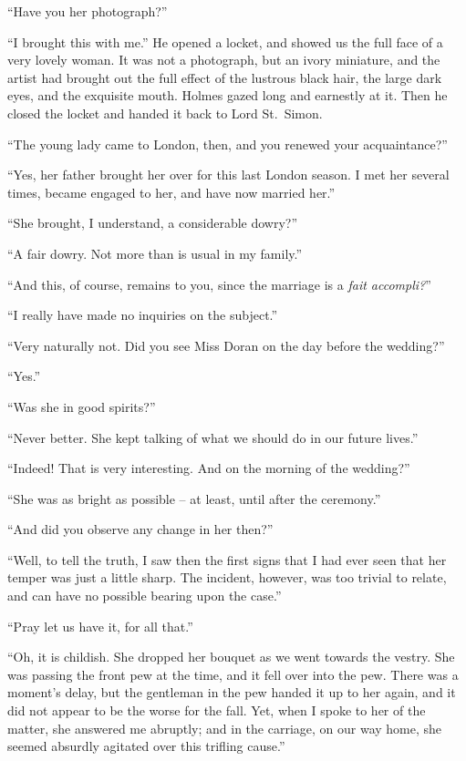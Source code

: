 “Have you her photograph?”

“I brought this with me.” He opened a locket, and showed
us the full face of a very lovely woman. It was not a
photograph, but an ivory miniature, and the artist had brought
out the full effect of the lustrous black hair, the large dark
eyes, and the exquisite mouth. Holmes gazed long and earnestly
at it. Then he closed the locket and handed it back
to Lord St.~Simon.

“The young lady came to London, then, and you renewed
your acquaintance?”

“Yes, her father brought her over for this last London
season. I met her several times, became engaged to her, and
have now married her.”

“She brought, I understand, a considerable dowry?”

“A fair dowry. Not more than is usual in my family.”

“And this, of course, remains to you, since the marriage is
a \textit{fait accompli?}”

“I really have made no inquiries on the subject.”

“Very naturally not. Did you see Miss Doran on the day
before the wedding?”

“Yes.”

“Was she in good spirits?”

“Never better. She kept talking of what we should do in
our future lives.”

“Indeed! That is very interesting. And on the morning
of the wedding?”

“She was as bright as possible -- at least, until after the
ceremony.”

“And did you observe any change in her then?”

“Well, to tell the truth, I saw then the first signs that I
had ever seen that her temper was just a little sharp. The
incident, however, was too trivial to relate, and can have no
possible bearing upon the case.”

“Pray let us have it, for all that.”

“Oh, it is childish. She dropped her bouquet as we went
towards the vestry. She was passing the front pew at the
time, and it fell over into the pew. There was a moment’s
delay, but the gentleman in the pew handed it up to her
again, and it did not appear to be the worse for the fall.
Yet, when I spoke to her of the matter, she answered me
abruptly; and in the carriage, on our way home, she seemed
absurdly agitated over this trifling cause.”

